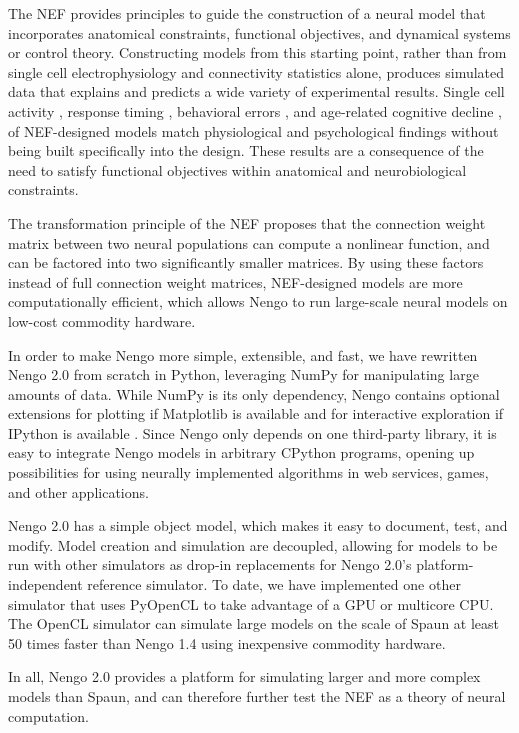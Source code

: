 \documentclass{frontiersSCNS}
\begin{document}
The NEF provides principles
to guide the construction of
a neural model
that incorporates anatomical constraints,
functional objectives, and
dynamical systems or control theory.
Constructing models from this starting point,
rather than from single cell electrophysiology
and connectivity statistics alone,
produces simulated data that explains
and predicts a wide variety of experimental results.
Single cell activity \citep{stewart2012},
response timing \citep{stewart2009a},
behavioral errors \citep{choo2010},
and age-related cognitive decline \citep{rasmussen2014},
of NEF-designed models match
physiological and psychological findings
without being built specifically into the design.
These results are a consequence of
the need to satisfy functional objectives
within anatomical and neurobiological constraints.

The transformation principle of the NEF
proposes that the connection weight matrix
between two neural populations
can compute a nonlinear function,
and can be factored into
two significantly smaller matrices.
By using these factors
instead of full connection weight matrices,
NEF-designed models are
more computationally efficient,
which allows Nengo to run
large-scale neural models
on low-cost commodity hardware.

In order to make Nengo more simple, extensible, and fast,
we have rewritten Nengo 2.0 from scratch in Python,
leveraging NumPy \citep{oliphant2007}
for manipulating large amounts of data.
While NumPy is its only dependency,
Nengo contains optional extensions
for plotting if Matplotlib is available
\citep{hunter2007}
and for interactive exploration
if IPython is available \citep{perez2007}.
Since Nengo only depends on one third-party library,
it is easy to integrate Nengo models
in arbitrary CPython programs,
opening up possibilities
for using neurally implemented algorithms
in web services, games, and other applications.

Nengo 2.0 has a simple object model,
which makes it easy to
document, test, and modify.
Model creation and simulation are decoupled,
allowing for models to be run with
other simulators as drop-in replacements for Nengo 2.0's
platform-independent reference simulator.
To date, we have implemented one other simulator
that uses PyOpenCL to take advantage
of a GPU or multicore CPU.
The OpenCL simulator can simulate
large models on the scale of Spaun
at least 50 times faster than Nengo 1.4
using inexpensive commodity hardware.

In all, Nengo 2.0 provides a platform for
simulating larger and more complex models than Spaun,
and can therefore further test the NEF
as a theory of neural computation.
\end{document}
